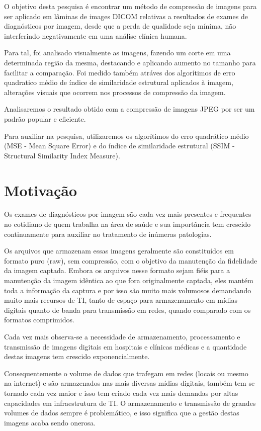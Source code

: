 \documentclass{IEEEtran}
\begin{document}
O objetivo desta pesquisa é encontrar um método de compressão de imagens
para ser aplicado em lâminas de images DICOM relativas a resultados de
exames de diagnósticos por imagem, desde que a perda de qualidade seja
mínima, não interferindo negativamente em uma análise clínica humana.

Para tal, foi analisado visualmente as imagens, fazendo um corte em uma
determinada região da mesma, destacando e aplicando aumento no tamanho
para facilitar a comparação. Foi medido também atráves dos algorítimos
de erro quadratico médio de índice de similaridade estrutural aplicados
à imagem, alterações visuais que ocorrem nos processos de compressão da
imagem.

Analisaremos o resultado obtido com a compressão de imagens JPEG por ser
um padrão popular e eficiente\cite{arthur2017making}.

Para auxiliar na pesquisa, utilizaremos os algorítimos do erro
quadrático médio (MSE - Mean Square Error) e do índice de similaridade
estrutural (SSIM - Structural Similarity Index Measure).
\cite{rosebrock2014python}

    \section{Motivação}\label{motivauxe7uxe3o}

    Os exames de diagnósticos por imagem são cada vez mais presentes e
frequentes no cotidiano de quem trabalha na área de saúde e sua
importância tem crescido continuamente para auxiliar no tratamento de
inúmeras patologias.

Os arquivos que armazenam essas imagens geralmente são constituídos em
formato puro (raw), sem compressão, com o objetivo da manutenção da
fidelidade da imagem captada. Embora os arquivos nesse formato sejam
fiéis para a manutenção da imagem idêntica ao que fora originalmente
captada, eles mantém toda a informação da captura e por isso são muito
mais volumosos demandando muito mais recursos de TI, tanto de espaço
para armazenamento em mídias digitais quanto de banda para transmissão
em redes, quando comparado com os formatos comprimidos.

Cada vez mais observa-se a necessidade de armazenamento, processamento e
transmissão de imagens digitais em hospitais e clínicas médicas e a
quantidade destas imagens tem crescido exponencialmente.

Consequentemente o volume de dados que trafegam em redes (locais ou
mesmo na internet) e são armazenados nas mais diversas mídias digitais,
também tem se tornado cada vez maior e isso tem criado cada vez mais
demandas por altas capacidades em infraestrutura de TI. O armazenamento
e transmissão de grandes volumes de dados sempre é problemático, e isso
significa que a gestão destas imagens acaba sendo onerosa.
\end{document}
